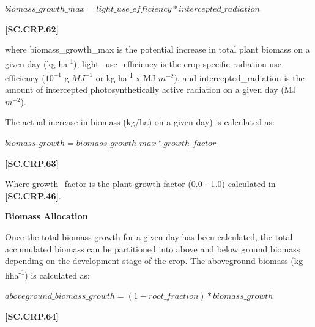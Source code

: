     \begin{center}
        \(biomass\_growth\_max=light\_use\_efficiency * intercepted\_radiation\) 
    \end{center}
        \vspace{0.5cm}
    
            {\raggedleft \textbf{[SC.CRP.62]}\par}
            \vspace{0.5cm}

where biomass\_growth\_max is the potential increase in total plant biomass on a given day (kg ha\textsuperscript{-1}), light\_use\_efficiency is the crop-specific radiation use efficiency (\(10^{-1}\) g \(MJ^{-1}\) or kg ha\textsuperscript{-1} x MJ \(m^{-2}\)), and intercepted\_radiation is the amount of intercepted photosynthetically active radiation on a given day (MJ \(m^{-2}\)). 	

The actual increase in biomass (kg/ha) on a given day) is calculated as:
   \vspace{0.2cm}

    \begin{center}
        \(biomass\_growth=biomass\_growth\_max * growth\_factor\) 
    \end{center}
        \vspace{0.5cm}
    
            {\raggedleft \textbf{[SC.CRP.63]}\par}
            \vspace{0.5cm}

Where growth\_factor is the plant growth factor (0.0 - 1.0) calculated in \textbf{[SC.CRP.46]}.
\vspace{0.5cm}

\textbf{Biomass Allocation}
\vspace{0.2cm}

Once the total biomass growth for a given day has been calculated, the total accumulated biomass can be partitioned into above and below ground biomass depending on the development stage of the crop. The aboveground biomass (kg hha\textsuperscript{-1}) is calculated as:
   \vspace{0.2cm}

    \begin{center}
        \(aboveground\_biomass\_growth=(1-root\_fraction) * biomass\_growth\) 
    \end{center}
        \vspace{0.5cm}
    
            {\raggedleft \textbf{[SC.CRP.64]}\par}
            \vspace{0.5cm}

